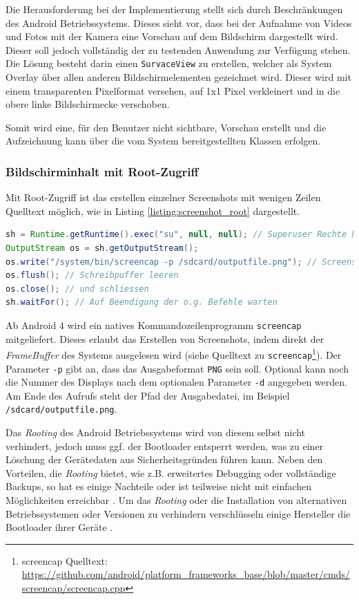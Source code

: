 Die Herausforderung bei der Implementierung stellt sich durch Beschränkungen des Android Betriebssystems.
Dieses sieht vor, dass bei der Aufnahme von Videos und Fotos mit der Kamera eine Vorschau auf dem Bildschirm dargestellt wird.
Dieser soll jedoch vollständig der zu testenden Anwendung zur Verfügung stehen.
Die Lösung besteht darin einen \texttt{SurvaceView} zu erstellen, welcher als System Overlay über allen anderen Bildschirmelementen gezeichnet wird. 
Dieser wird mit einem transparenten Pixelformat versehen, auf 1x1 Pixel verkleinert und in die obere linke Bildschirmecke verschoben.

Somit wird eine, für den Benutzer nicht sichtbare, Vorschau erstellt und die Aufzeichnung kann über die vom System bereitgestellten Klassen erfolgen.


\subsubsection{Bildschirminhalt mit Root-Zugriff}
Mit Root-Zugriff ist das erstellen einzelner Screenshots mit wenigen Zeilen Quelltext möglich, wie in Listing \ref{listing:screenshot_root} dargestellt.

\begin{lstlisting}[label=listing:screenshot_root,language=Java, caption=Screenshot Aufnahme mit Root-Zugriff]
sh = Runtime.getRuntime().exec("su", null, null); // Superuser Rechte holen
OutputStream os = sh.getOutputStream();
os.write("/system/bin/screencap -p /sdcard/outputfile.png"); // Screenshot erstellen
os.flush(); // Schreibpuffer leeren 
os.close(); // und schliessen
sh.waitFor(); // Auf Beendigung der o.g. Befehle warten
\end{lstlisting}

Ab Android 4 wird ein natives Kommandozeilenprogramm \texttt{screencap} mitgeliefert.
Dieses erlaubt das Erstellen von Screenshots, indem direkt der \emph{FrameBuffer} des Systems ausgelesen wird (siehe Quelltext zu \texttt{screencap}\footnote{screencap Quelltext: \url{https://github.com/android/platform_frameworks_base/blob/master/cmds/screencap/screencap.cpp}}).
Der Parameter \texttt{-p} gibt an, dass das Ausgabeformat \texttt{PNG} sein soll. 
Optional kann noch die Nummer des Displays nach dem optionalen Parameter \texttt{-d} angegeben werden.
Am Ende des Aufrufs steht der Pfad der Ausgabedatei, im Beispiel \texttt{/sdcard/outputfile.png}. 

Das \emph{Rooting} des Android Betriebssystems wird von diesem selbst nicht verhindert, jedoch muss ggf. der Bootloader entsperrt werden, was zu einer Löschung der Gerätedaten aus Sicherheitsgründen führen kann. 
Neben den Vorteilen, die \emph{Rooting} bietet, wie z.B. erweitertes Debugging oder vollständige Backups, so hat es einige Nachteile oder ist teilweise nicht mit einfachen Möglichkeiten erreichbar \cite[vgl.][]{androidsecurity}.
Um das \emph{Rooting} oder die Installation von alternativen Betriebssystemen oder Versionen zu verhindern verschlüsseln einige Hersteller die Bootloader ihrer Geräte \cite[vgl.][6\psq]{androiddataintegrity}.

